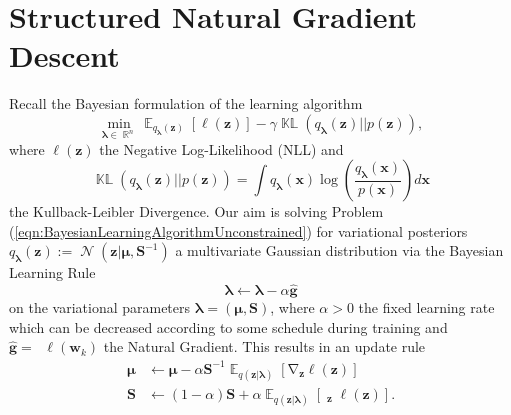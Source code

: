 \documentclass[a4paper, 11pt, oneside]{scrartcl}
\theoremstyle{break}
\DeclareMathOperator{\Normal}{\mathcal{N}}
\DeclareMathOperator{\Real}{\mathbb{R}}
\DeclareMathOperator{\Expect}{\mathbb{E}}
\DeclareMathOperator{\grad}{\nabla}
\DeclareMathOperator{\ngrad}{\tilde{\nabla}}
\DeclareMathOperator{\Hessian}{\nabla^2}
\DeclareMathOperator{\KL}{\mathbb{KL}}
\newcommand{\matr}[1]{\boldsymbol{#1}}
\numberwithin{equation}{section}
\begin{document}
	\section{Structured Natural Gradient Descent}
		Recall the Bayesian formulation of the learning algorithm
		\begin{equation}
			\min_{\matr{\lambda} \in \Real^n} \Expect_{q_{\matr{\lambda}} (\matr{z})} [\ell (\matr{z})] - \gamma \KL (q_{\matr{\lambda}} (\matr{z}) || p(\matr{z})),
			\label{eqn:BayesianLearningAlgorithmUnconstrained}
		\end{equation}
		where $\ell(\matr{z})$ the Negative Log-Likelihood (NLL) and 
		\begin{equation*}
			\KL (q_{\matr{\lambda}} (\matr{z}) || p(\matr{z})) = \int q_{\matr{\lambda}} (\matr{x}) \log \left( \frac{q_{\matr{\lambda}} (\matr{x})}{p (\matr{x})} \right) d \matr{x}
		\end{equation*}
		the Kullback-Leibler Divergence. 
		Our aim is solving Problem (\ref{eqn:BayesianLearningAlgorithmUnconstrained}) for variational posteriors $q_{\matr{\lambda}} (\matr{z}) := \Normal(\matr{z} | \matr{\mu}, \matr{S}^{-1})$ a multivariate Gaussian distribution via the Bayesian Learning Rule \parencite{LSK20}
		\begin{equation}
			\matr{\lambda} \leftarrow \matr{\lambda} - \alpha \matr{\hat{g}}
			\label{eqn:BLR}
		\end{equation}
		on the variational parameters $\matr{\lambda} = (\matr{\mu}, \matr{S})$, where $\alpha > 0$ the fixed learning rate which can be decreased according to some schedule during training and $\matr{\hat{g}} = \ngrad \ell (\matr{w}_k)$ the Natural Gradient.
		This results in an update rule 
		\begin{align*}
			\matr{\mu} &\leftarrow \matr{\mu} - \alpha \matr{S}^{-1} \Expect_{q(\matr{z} | \matr{\lambda})} [\grad_{\matr{z}} \ell (\matr{z})] \\
			\matr{S} &\leftarrow (1 - \alpha) \matr{S} + \alpha \Expect_{q(\matr{z} | \matr{\lambda})} [\Hessian_{\matr{z}} \ell (\matr{z})].
		\end{align*}
\end{document}
